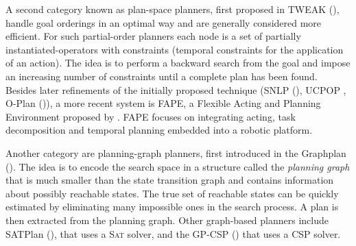 A second category known as plan-space planners, first proposed in TWEAK (\cite{chapman1987planning}), handle goal orderings in an optimal way and are generally considered more efficient. 
For such partial-order planners each node is a set of partially instantiated-operators with constraints (\eg temporal constraints for the application of an action).
The idea is to perform a backward search from the goal and impose an increasing number of constraints until a complete plan has been found.
Besides later refinements of the initially proposed technique (SNLP (\cite{mcallester1991systematic}), UCPOP \cite{penberthy1992ucpop}, O-Plan (\cite{tate1994plan2})), a more recent system is FAPE, a Flexible Acting and Planning Environment proposed by \cite{dvorak2014flexible}.
FAPE focuses on integrating acting, task decomposition and temporal planning embedded into a robotic platform.

Another category are planning-graph planners, first introduced in the Graphplan (\cite{blum:97}).
The idea is to encode the search space in a structure called the \textit{planning graph} that is much smaller than the state transition graph and contains information about possibly reachable states.
The true set of reachable states can be quickly estimated by eliminating many impossible ones in the search process.
A plan is then extracted from the planning graph.
Other graph-based planners include SATPlan (\cite{kautz:06,kautz:99,rintanen2014madagascar}), that uses a \textsc{Sat} solver, and the GP-CSP (\cite{do:01,lopez2003generalizing,cooper2011weighted}) that uses a \textsc{CSP} solver.

